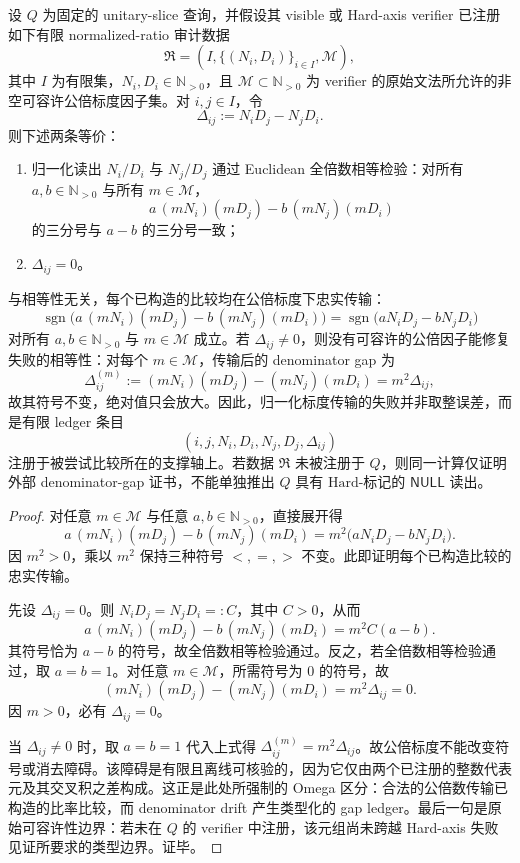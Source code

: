 \begin{proposition}\label{distill:euclid_elements-proportion_and_denominator_spectrum_families-cdim-all-multiple-gap-ledger}
设 \(Q\) 为固定的 unitary-slice 查询，并假设其 visible 或 Hard-axis verifier 已注册如下有限 normalized-ratio 审计数据
\[
\mathfrak R=(I,\{(N_i,D_i)\}_{i\in I},\mathcal M),
\]
其中 \(I\) 为有限集，\(N_i,D_i\in\mathbb N_{>0}\)，且 \(\mathcal M\subset\mathbb N_{>0}\) 为 verifier 的原始文法所允许的非空可容许公倍标度因子集。对 \(i,j\in I\)，令
\[
\Delta_{ij}:=N_iD_j-N_jD_i .
\]
则下述两条等价：
\begin{enumerate}
  \item 归一化读出 \(N_i/D_i\) 与 \(N_j/D_j\) 通过 Euclidean 全倍数相等检验：对所有 \(a,b\in\mathbb N_{>0}\) 与所有 \(m\in\mathcal M\)，
  \[
  a\,(mN_i)(mD_j)-b\,(mN_j)(mD_i)
  \]
  的三分号与 \(a-b\) 的三分号一致；
  \item \(\Delta_{ij}=0\)。
\end{enumerate}
与相等性无关，每个已构造的比较均在公倍标度下忠实传输：
\[
\operatorname{sgn}\!\bigl(a\,(mN_i)(mD_j)-b\,(mN_j)(mD_i)\bigr)
=\operatorname{sgn}\!\bigl(aN_iD_j-bN_jD_i\bigr)
\]
对所有 \(a,b\in\mathbb N_{>0}\) 与 \(m\in\mathcal M\) 成立。若 \(\Delta_{ij}\ne0\)，则没有可容许的公倍因子能修复失败的相等性：对每个 \(m\in\mathcal M\)，传输后的 denominator gap 为
\[
\Delta_{ij}^{(m)}:=(mN_i)(mD_j)-(mN_j)(mD_i)=m^2\Delta_{ij},
\]
故其符号不变，绝对值只会放大。因此，归一化标度传输的失败并非取整误差，而是有限 ledger 条目
\[
(i,j,N_i,D_i,N_j,D_j,\Delta_{ij})
\]
注册于被尝试比较所在的支撑轴上。若数据 \(\mathfrak R\) 未被注册于 \(Q\)，则同一计算仅证明外部 denominator-gap 证书，不能单独推出 \(Q\) 具有 \(\mathrm{Hard}\)-标记的 \(\mathsf{NULL}\) 读出。
\end{proposition}
\begin{proof}
对任意 \(m\in\mathcal M\) 与任意 \(a,b\in\mathbb N_{>0}\)，直接展开得
\[
 a\,(mN_i)(mD_j)-b\,(mN_j)(mD_i)
 =m^2\bigl(aN_iD_j-bN_jD_i\bigr).
\]
因 \(m^2>0\)，乘以 \(m^2\) 保持三种符号 \(<,=,>\) 不变。此即证明每个已构造比较的忠实传输。

先设 \(\Delta_{ij}=0\)。则 \(N_iD_j=N_jD_i=:C\)，其中 \(C>0\)，从而
\[
 a\,(mN_i)(mD_j)-b\,(mN_j)(mD_i)=m^2C(a-b).
\]
其符号恰为 \(a-b\) 的符号，故全倍数相等检验通过。反之，若全倍数相等检验通过，取 \(a=b=1\)。对任意 \(m\in\mathcal M\)，所需符号为 \(0\) 的符号，故
\[
(mN_i)(mD_j)-(mN_j)(mD_i)=m^2\Delta_{ij}=0.
\]
因 \(m>0\)，必有 \(\Delta_{ij}=0\)。

当 \(\Delta_{ij}\ne0\) 时，取 \(a=b=1\) 代入上式得 \(\Delta_{ij}^{(m)}=m^2\Delta_{ij}\)。故公倍标度不能改变符号或消去障碍。该障碍是有限且离线可核验的，因为它仅由两个已注册的整数代表元及其交叉积之差构成。这正是此处所强制的 Omega 区分：合法的公倍数传输已构造的比率比较，而 denominator drift 产生类型化的 gap ledger。最后一句是原始可容许性边界：若未在 \(Q\) 的 verifier 中注册，该元组尚未跨越 Hard-axis 失败见证所要求的类型边界。证毕。
\end{proof}

